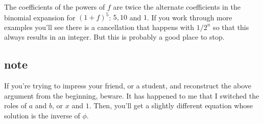 \documentclass[11pt, oneside]{article}
\begin{document}
The coefficients of the powers of $f$ are twice the alternate coefficients in the binomial expansion for $(1 + f)^5$:  $5, 10$ and $1$.  If you work through more examples you'll see there is a cancellation that happens with $1/2^n$ so that this always results in an integer.  But this is probably a good place to stop.

\subsection*{note}

If you're trying to impress your friend, or a student, and reconstruct the above argument from the beginning, beware.  It has happened to me that I switched the roles of $a$ and $b$, or $x$ and $1$.  Then, you'll get a slightly different equation whose solution is the inverse of $\phi$.
\end{document}
